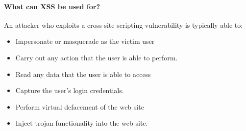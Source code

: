\paragraph{What can XSS be used for?}

An attacker who exploits a cross-site scripting vulnerability is typically able to:
\begin{itemize}
    \item Impersonate or masquerade as the victim user
    \item Carry out any action that the user is able to perform.
    \item Read any data that the user is able to access
    \item Capture the user's login credentials.
    \item Perform virtual defacement of the web site
    \item Inject trojan functionality into the web site.
\end{itemize}
